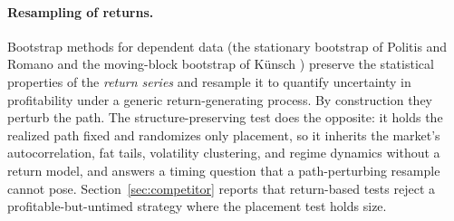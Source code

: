 \documentclass[risks,article,submit,pdftex,oneauthor]{Definitions/mdpi}
\begin{document}
\paragraph{Resampling of returns.} Bootstrap methods for dependent data (the stationary
bootstrap of Politis and Romano \citep{politisromano1994} and the moving-block bootstrap of
K\"unsch \citep{Kunsch1989}) preserve the statistical properties of the \emph{return
series} and resample it to quantify uncertainty in profitability under a generic
return-generating process. By construction they perturb the path. The structure-preserving
test does the opposite: it holds the realized path fixed and randomizes only placement, so
it inherits the market's autocorrelation, fat tails, volatility clustering, and regime
dynamics without a return model, and answers a timing question that a path-perturbing
resample cannot pose. Section~\ref{sec:competitor} reports that
return-based tests reject a profitable-but-untimed strategy where the placement test holds
size.
\end{document}
